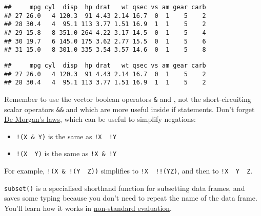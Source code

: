 \begin{verbatim}
##     mpg cyl  disp  hp drat   wt qsec vs am gear carb
## 27 26.0   4 120.3  91 4.43 2.14 16.7  0  1    5    2
## 28 30.4   4  95.1 113 3.77 1.51 16.9  1  1    5    2
## 29 15.8   8 351.0 264 4.22 3.17 14.5  0  1    5    4
## 30 19.7   6 145.0 175 3.62 2.77 15.5  0  1    5    6
## 31 15.0   8 301.0 335 3.54 3.57 14.6  0  1    5    8
\end{verbatim}

\begin{Shaded}
\begin{Highlighting}[]
\NormalTok{mtcars[mtcars}\OperatorTok{$}\OperatorTok{==}\StringTok{ } \OperatorTok{&}\StringTok{ }\OperatorTok{$}\OperatorTok{==}\StringTok{ }\NormalTok{, ]}
\end{Highlighting}
\end{Shaded}

\begin{verbatim}
##     mpg cyl  disp  hp drat   wt qsec vs am gear carb
## 27 26.0   4 120.3  91 4.43 2.14 16.7  0  1    5    2
## 28 30.4   4  95.1 113 3.77 1.51 16.9  1  1    5    2
\end{verbatim}

Remember to use the vector boolean operators \texttt{\&} and
\texttt{\textbar{}}, not the short-circuiting scalar operators
\texttt{\&\&} and \texttt{\textbar{}\textbar{}} which are more useful
inside if statements. Don't forget
\href{http://en.wikipedia.org/wiki/De_Morgan's_laws}{De Morgan's laws},
which can be useful to simplify negations:

\begin{itemize}
\tightlist
\item
  \texttt{!(X\ \&\ Y)} is the same as \texttt{!X\ \textbar{}\ !Y}
\item
  \texttt{!(X\ \textbar{}\ Y)} is the same as \texttt{!X\ \&\ !Y}
\end{itemize}

For example, \texttt{!(X\ \&\ !(Y\ \textbar{}\ Z))} simplifies to
\texttt{!X\ \textbar{}\ !!(Y\textbar{}Z)}, and then to
\texttt{!X\ \textbar{}\ Y\ \textbar{}\ Z}.

\texttt{subset()} is a specialised shorthand function for subsetting
data frames, and saves some typing because you don't need to repeat the
name of the data frame. You'll learn how it works in
\protect\hyperlink{nse}{non-standard evaluation}. 

\begin{Shaded}
\begin{Highlighting}[]
\OperatorTok{==}\StringTok{ }\NormalTok{)}
\end{Highlighting}
\end{Shaded}

